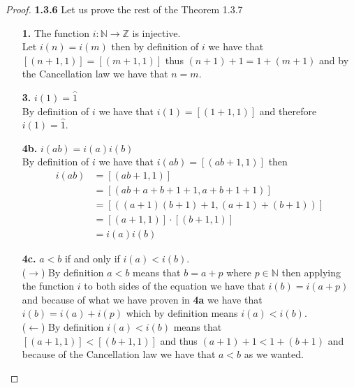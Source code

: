 \documentclass[11pt]{article}
\newcommand{\N}{\mathbb{N}}
\newcommand{\Z}{\mathbb{Z}}
\theoremstyle{definition}
\begin{document}
    \begin{proof}{\textbf{1.3.6}}
    Let us prove the rest of the Theorem 1.3.7 
    \begin{itemize}
    \item [\textbf{1.}] The function $i: \N \rightarrow \Z$ is injective.\\
    Let $i(n)=i(m)$ then by definition of $i$ we have that $[(n+1,1)]=[(m+1,1)]$ thus
    $(n+1)+1=1+(m+1)$ and by the Cancellation law we have that $n=m$.
    \item [\textbf{3.}] $i(1)=\hat{1}$ \\
    By definition of $i$ we have that $i(1)=[(1+1,1)]$ and therefore $i(1)=\hat{1}$.
    \item [\textbf{4b.}] $i(ab)=i(a)i(b)$\\
    By definition of $i$ we have that $i(ab)=[(ab+1,1)]$ then
    \begin{align*}
        i(ab) &= [(ab+1,1)] \\
              &= [(ab+a+b+1+1,a+b+1+1)] \\
              &= [((a+1)(b+1)+1,(a+1)+(b+1))] \\
              &= [(a+1,1)]\cdot [(b+1,1)] \\
              &= i(a)i(b)        
    \end{align*}
    \item [\textbf{4c.}] $a < b$ if and only if $i(a) < i(b)$.\\
    ($\rightarrow$) By definition $a<b$ means that $b=a+p$ where $p\in\N$ then applying
    the function $i$ to both sides of the equation we have that $i(b)=i(a+p)$ and
    because of what we have proven in \textbf{4a} we have that $i(b)=i(a)+i(p)$ which by
    definition means $i(a)< i(b)$.\\
    ($\leftarrow$) By definition $i(a)<i(b)$ means that $[(a+1,1)]<[(b+1,1)]$ and thus
    $(a+1)+1<1+(b+1)$ and because of the Cancellation law we have that $a<b$ as we
    wanted.
    \end{itemize}
    \end{proof}
\end{document}
